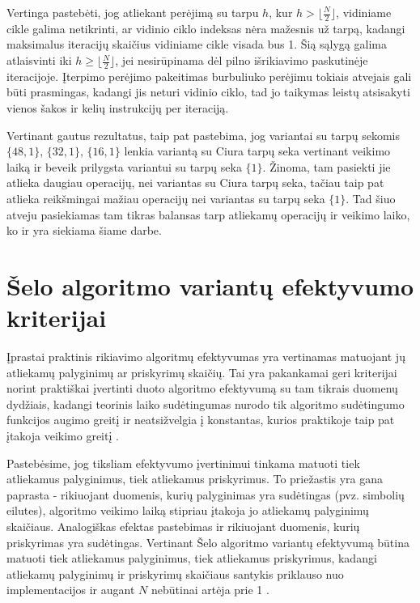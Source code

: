 \documentclass{VUMIFInfBakalaurinis}
\begin{document}
Vertinga pastebėti, jog atliekant perėjimą su tarpu $h$, kur $h > \lfloor\frac{N}{2}\rfloor$, vidiniame cikle galima netikrinti,
ar vidinio ciklo indeksas nėra mažesnis už tarpą, kadangi maksimalus iteracijų skaičius vidiniame cikle visada bus 1.
Šią sąlygą galima atlaisvinti iki $h \geq \lfloor\frac{N}{2}\rfloor$, jei nesirūpinama dėl pilno išrikiavimo paskutinėje iteracijoje.
Įterpimo perėjimo pakeitimas burbuliuko perėjimu tokiais atvejais gali būti prasmingas,
kadangi jis neturi vidinio ciklo, tad jo taikymas leistų atsisakyti vienos šakos ir kelių instrukcijų per iteraciją.  

Vertinant gautus rezultatus, taip pat pastebima, jog variantai su tarpų sekomis $\{48, 1\}$, $\{32, 1\}$, $\{16, 1\}$ lenkia variantą
su Ciura tarpų seka vertinant veikimo laiką ir beveik prilygsta variantui su tarpų seka $\{1\}$.
Žinoma, tam pasiekti jie atlieka daugiau operacijų, nei variantas su Ciura tarpų seka, tačiau taip pat atlieka reikšmingai mažiau operacijų nei variantas su tarpų seka $\{1\}$.
Tad šiuo atveju pasiekiamas tam tikras balansas tarp atliekamų operacijų ir veikimo laiko, ko ir yra siekiama šiame darbe.

\section{Šelo algoritmo variantų efektyvumo kriterijai}

Įprastai praktinis rikiavimo algoritmų efektyvumas yra vertinamas matuojant jų atliekamų palyginimų ar priskyrimų skaičių.
Tai yra pakankamai geri kriterijai norint praktiškai įvertinti duoto algoritmo efektyvumą su tam tikrais duomenų dydžiais,
kadangi teorinis laiko sudėtingumas nurodo tik algoritmo sudėtingumo funkcijos augimo greitį ir
neatsižvelgia į konstantas, kurios praktikoje taip pat įtakoja veikimo greitį \cite{biggar2005sorting}.

Pastebėsime, jog tiksliam efektyvumo įvertinimui tinkama matuoti tiek atliekamus palyginimus, tiek atliekamus priskyrimus.
To priežastis yra gana paprasta - rikiuojant duomenis, kurių palyginimas yra sudėtingas (pvz. simbolių eilutes),
algoritmo veikimo laiką stipriau įtakoja jo atliekamų palyginimų skaičiaus.
Analogiškas efektas pastebimas ir rikiuojant duomenis, kurių priskyrimas yra sudėtingas.
Vertinant Šelo algoritmo variantų efektyvumą būtina matuoti tiek atliekamus palyginimus, tiek atliekamus priskyrimus, kadangi
atliekamų palyginimų ir priskyrimų skaičiaus santykis priklauso nuo implementacijos ir augant $N$ nebūtinai artėja prie 1 \cite{Radavičius_Baranauskas_2013}.
\end{document}
